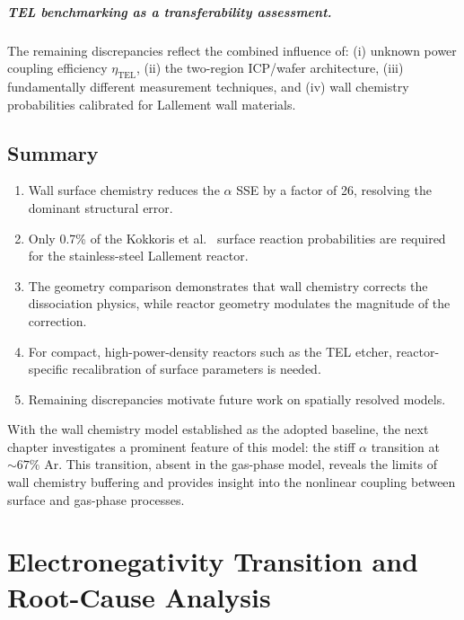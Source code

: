 \documentclass[11pt,a4paper]{report}
\begin{document}
\paragraph{TEL benchmarking as a transferability assessment.}  The remaining discrepancies reflect the combined influence of: (i) unknown power coupling efficiency $\eta_\mathrm{TEL}$, (ii) the two-region ICP/wafer architecture, (iii) fundamentally different measurement techniques, and (iv) wall chemistry probabilities calibrated for Lallement wall materials.

\section{Summary}
\label{sec:wall_summary}

\begin{enumerate}[nosep]
\item Wall surface chemistry reduces the $\alpha$ SSE by a factor of 26, resolving the dominant structural error.
\item Only 0.7\% of the Kokkoris et al.~\cite{Kokkoris2009} surface reaction probabilities are required for the stainless-steel Lallement reactor.
\item The geometry comparison demonstrates that wall chemistry corrects the dissociation physics, while reactor geometry modulates the magnitude of the correction.
\item For compact, high-power-density reactors such as the TEL etcher, reactor-specific recalibration of surface parameters is needed.
\item Remaining discrepancies motivate future work on spatially resolved models.
\end{enumerate}

With the wall chemistry model established as the adopted baseline, the next chapter investigates a prominent feature of this model: the stiff $\alpha$ transition at ${\sim}67\%$ Ar.  This transition, absent in the gas-phase model, reveals the limits of wall chemistry buffering and provides insight into the nonlinear coupling between surface and gas-phase processes.


\chapter{Electronegativity Transition and Root-Cause Analysis}
\label{ch:kink}
\end{document}
